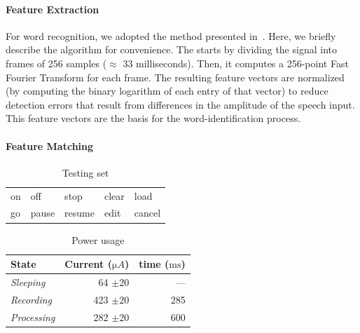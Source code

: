 \paragraph{Feature Extraction}
For word recognition, we adopted the method presented in~\cite{hopper1992fft}. Here, we briefly describe the algorithm for convenience. The \cim starts by dividing the signal into frames of 256 samples ($\approx$ 33 milliseconds). 
Then, it computes a 256-point Fast Fourier Transform for each frame. The resulting feature vectors are normalized (by computing the binary logarithm of each entry of that vector) to reduce detection errors that result from differences in the amplitude of the speech input. This feature vectors are the basis for the word-identification process. 

\paragraph{Feature Matching}
\begin{table}[t]
\centering
\caption{Testing set}
\label{tab:words}
\begin{tabular}{lllll}
\hline
on    & off  & stop & clear & load   \\
go & pause & resume & edit  & cancel  \\  
\hline  
\end{tabular}
\end{table}
%
\begin{table}[t]
	\centering
	\caption{Power usage}
	\label{tab:power_usage}
	\begin{tabular}{lrr}\hline
	\textbf{State} & \textbf{Current ($\si{\micro A}$)} & \textbf{time ($\si{\milli\second}$)} \\\hline
	\textit{Sleeping} & 64 $\pm$20 & --- \\
	\textit{Recording} & 423 $\pm$20 & 285   \\
	\textit{Processing} &  282 $\pm$20 & 600\\\hline
	\end{tabular}
\end{table}
